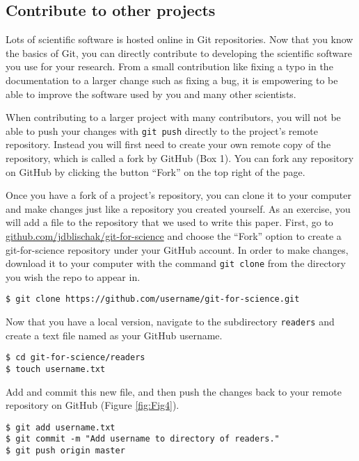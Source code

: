 \subsection{Contribute to other projects}

Lots of scientific software is hosted online in Git repositories.
Now that you know the basics of Git, you can directly contribute to developing the scientific software you use for your research.
From a small contribution like fixing a typo in the documentation to a larger change such as fixing a bug, it is empowering to be able to improve the software used by you and many other scientists.

When contributing to a larger project with many contributors, you will not be able to push your changes with \verb|git push| directly to the project's remote repository.
Instead you will first need to create your own remote copy of the repository, which is called a fork by GitHub (Box 1).
You can fork any repository on GitHub by clicking the button ``Fork'' on the top right of the page.

Once you have a fork of a project's repository, you can clone it to your computer and make changes just like a repository you created yourself.
As an exercise, you will add a file to the repository that we used to write this paper.
First, go to \href{https://github.com/jdblischak/git-for-science}{github.com/jdblischak/git-for-science} and choose the ``Fork'' option to create a git-for-science repository under your GitHub account.
In order to make changes, download it to your computer with the command \verb|git clone| from the directory you wish the repo to appear in.

\begin{lstlisting}
$ git clone https://github.com/username/git-for-science.git
\end{lstlisting}

Now that you have a local version, navigate to the subdirectory \verb|readers| and create a text file named as your GitHub username.

\begin{lstlisting}
$ cd git-for-science/readers
$ touch username.txt
\end{lstlisting}

Add and commit this new file, and then push the changes back to your remote repository on GitHub (Figure \ref{fig:Fig4}).

\begin{lstlisting}
$ git add username.txt
$ git commit -m "Add username to directory of readers."
$ git push origin master
\end{lstlisting}

